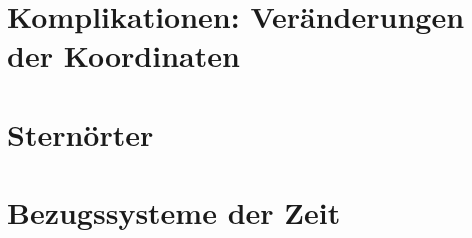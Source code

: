 \section{Komplikationen: Veränderungen der Koordinaten}
\section{Sternörter}
\section{Bezugssysteme der Zeit}

